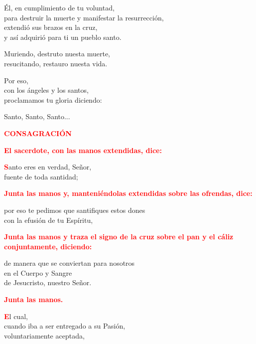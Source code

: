 \documentclass[12pt, letterpaper]{report}
\begin{document}
\'El, en cumplimiento de tu voluntad, \\
para destruir la muerte y manifestar la resurrecci\'on, \\
extendi\'o sus brazos en la cruz, \\
y as\'i adquiri\'o para ti un pueblo santo. \newline

Muriendo, destruto nuesta muerte, \\
resucitando, restauro nuesta vida. \newline

Por eso, \\
con los \'angeles y los santos, \\
proclamamos tu gloria diciendo: \newline

Santo, Santo, Santo...

\newpage

\Large {\bfseries \textcolor{red}{CONSAGRACI\'ON}} \newline

\large{\bfseries \textcolor{red}{El sacerdote, con las manos extendidas, dice:}}

\lettrine[lines=1]{\bfseries \textcolor{red}{S}}{}\Large anto eres en verdad, Se\~nor,\\
fuente de toda santidad;\newline

\large{\bfseries \textcolor{red}{Junta las manos y, manteni\'endolas extendidas sobre las ofrendas, dice:}}\newline

\Large por eso te pedimos que santifiques estos dones\\
con la efusi\'on de tu Esp\'iritu,\newline

\large{\bfseries \textcolor{red}{Junta las manos y traza el signo de la cruz sobre el pan y el c\'aliz conjuntamente, diciendo:}}\newline

\Large de manera que se conviertan para nosotros\\
en el Cuerpo y \Huge{\textcolor{red}{}} \Large Sangre\\
de Jesucristo, nuestro Se\~nor.\newline

\large{\bfseries \textcolor{red}{Junta las manos.}}

\lettrine[lines=1]{\bfseries \textcolor{red}{E}}{}\Large l cual,\\
cuando iba a ser entregado a su Pasi\'on,\\
voluntariamente aceptada,\newline
\end{document}
